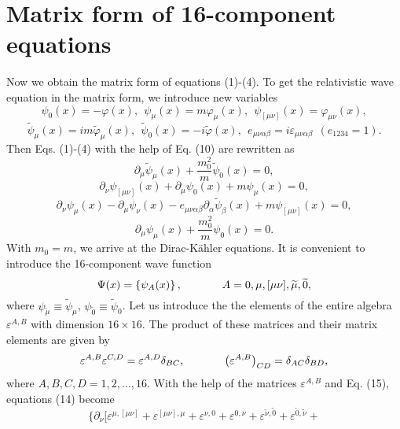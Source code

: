 \documentclass[a4paper,12pt]{article}
\begin{document}
\section{Matrix form of 16-component equations}

Now we obtain the matrix form of equations (1)-(4). To get the
relativistic wave equation in the matrix form, we introduce new
variables
\[
\psi _0 (x)=-\varphi (x) ,~~ \psi _\mu (x)=m\varphi _\mu (x) ,
~~\psi _{[\mu \nu ]}(x)=\varphi _{\mu \nu } (x) ,
\]
\[
 \widetilde{\psi }_\mu (x)=im\widetilde{ \varphi }_\mu (x) ,~~
\widetilde{\psi }_0 (x)=-i\widetilde{\varphi } (x) ,~~ e_{\mu \nu
\alpha \beta }=i\varepsilon _{\mu \nu \alpha \beta }~~
(e_{1234}=1).
\]
Then Eqs. (1)-(4) with the help of Eq. (10) are rewritten as
\[
\partial _\mu \widetilde{\psi }_\mu (x)+\frac{m_0^2}{m}\widetilde{\psi }_0 (x)=0 ,
\]
\[
\partial _\nu \psi _{[\mu \nu ]}(x)+\partial _\mu \psi _0 (x)+m\psi
_\mu (x)=0 ,
\]
\vspace{-8mm}
\begin{equation}  \label{14}
\end{equation}
\vspace{-8mm}
\[
\partial _\nu \psi _\mu (x)-\partial _\mu \psi _\nu (x)-e_{\mu \nu \alpha \beta
}\partial _\alpha \widetilde{\psi }_\beta (x)+m\psi _{[\mu \nu
]}(x)=0 ,
\]
\[
\partial _\mu \psi _\mu (x)+\frac{m_0^2}{m}\psi _0 (x)=0 .
\]
With $m_0=m$, we arrive at the Dirac-K\"ahler equations. It is
convenient to introduce the 16-component wave function
\begin{equation}
\Psi (x)=\left\{ \psi _A (x)\right\} ,\hspace{0.5in}A=0,\mu ,[\mu
\nu ], \widetilde{\mu },\widetilde{0} , \label{15}
\end{equation}
where $\psi _{\widetilde{\mu}}\equiv\widetilde{\psi}_\mu$, $\psi
_{\widetilde{0}}\equiv\widetilde{\psi}_0$. Let us introduce the
the elements of the entire algebra $\varepsilon ^{A,B}$
\cite{Bogush} with dimension $16\times 16$. The product of these
matrices and their matrix elements are given by
\begin{equation}
\varepsilon ^{A,B}\varepsilon ^{C,D}=\varepsilon ^{A,D}\delta
_{BC} ,\hspace{0.5in}\left( \varepsilon ^{A,B}\right) _{CD}=\delta
_{AC}\delta _{BD} ,\label{16}
\end{equation}
where $A,B,C,D=1,2,...,16$. With the help of the matrices
$\varepsilon ^{A,B}$ and Eq. (15), equations (14) become
\[
\biggl \{\partial _\nu \biggl [\varepsilon ^{\mu ,[\mu \nu
]}+\varepsilon ^{[\mu \nu ],\mu }+\varepsilon ^{\nu
,0}+\varepsilon ^{0,\nu }+\varepsilon ^{ \widetilde{\nu
},\widetilde{0}}+\varepsilon ^{\widetilde{0},\widetilde{\nu } }+
\]
\end{document}
